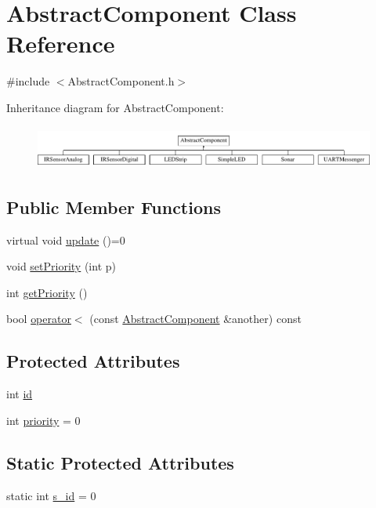\hypertarget{class_abstract_component}{}\section{Abstract\+Component Class Reference}
\label{class_abstract_component}


{\ttfamily \#include $<$Abstract\+Component.\+h$>$}

Inheritance diagram for Abstract\+Component\+:\begin{figure}[H]
\begin{center}
\leavevmode
\includegraphics[height=1.435897cm]{class_abstract_component}
\end{center}
\end{figure}
\subsection*{Public Member Functions}
\begin{DoxyCompactItemize}
\item 
virtual void \hyperlink{class_abstract_component_af25a90b8ab213762221c3b358d9873f3}{update} ()=0
\item 
void \hyperlink{class_abstract_component_a58a59a9ea6c3b4c86fb3bf98ff1eaaef}{set\+Priority} (int p)
\item 
int \hyperlink{class_abstract_component_ac0b440d1d642ff1292ec3c544d75a8f1}{get\+Priority} ()
\item 
bool \hyperlink{class_abstract_component_a0c2e458144111c5f599c66f168516abc}{operator$<$} (const \hyperlink{class_abstract_component}{Abstract\+Component} \&another) const
\end{DoxyCompactItemize}
\subsection*{Protected Attributes}
\begin{DoxyCompactItemize}
\item 
int \hyperlink{class_abstract_component_a9c9c548149681b1a1dd935e66ed5dd11}{id}
\item 
int \hyperlink{class_abstract_component_aff57dfa5f31be093a06b55560e33fb95}{priority} = 0
\end{DoxyCompactItemize}
\subsection*{Static Protected Attributes}
\begin{DoxyCompactItemize}
\item 
static int \hyperlink{class_abstract_component_a99ce3e5fe7d73dac569b874c15fcaf0d}{s\+\_\+id} = 0
\end{DoxyCompactItemize}


